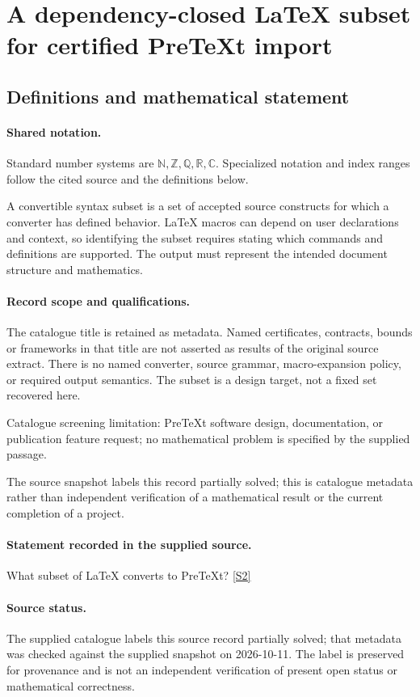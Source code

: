 \documentclass[11pt]{article}
\newcommand{\sref}[2]{\hyperlink{source:#1:#2}{[S#2]}}
\begin{document}
\section{A dependency-closed LaTeX subset for certified PreTeXt import}\label{statement}

\subsection{Definitions and mathematical statement}

\paragraph{Shared notation.}Standard number systems are $\mathbb N,\mathbb Z,\mathbb Q,\mathbb R,\mathbb C$. Specialized notation and index ranges follow the cited source and the definitions below.


A convertible syntax subset is a set of accepted source constructs for which a converter has defined behavior. LaTeX macros can depend on user declarations and context, so identifying the subset requires stating which commands and definitions are supported. The output must represent the intended document structure and mathematics.
\paragraph{Record scope and qualifications.}
The catalogue title is retained as metadata. Named certificates, contracts, bounds or frameworks in that title are not asserted as results of the original source extract.
There is no named converter, source grammar, macro-expansion policy, or required output semantics. The subset is a design target, not a fixed set recovered here.

Catalogue screening limitation: PreTeXt software design, documentation, or publication feature request; no mathematical problem is specified by the supplied passage.

The source snapshot labels this record partially solved; this is catalogue metadata rather than independent verification of a mathematical result or the current completion of a project.
\paragraph{Statement recorded in the supplied source.}
What subset of LaTeX converts to PreTeXt? \sref{statement}{2}
\paragraph{Source status.}
The supplied catalogue labels this source record partially solved; that metadata was checked against the supplied snapshot on 2026-10-11. The label is preserved for provenance and is not an independent verification of present open status or mathematical correctness.
\end{document}
